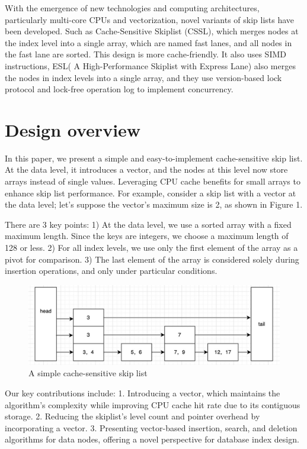 \documentclass{article}
\begin{document}
With the emergence of new technologies and computing architectures, particularly multi-core CPUs and vectorization, novel variants of skip lists have been developed. Such as Cache-Sensitive Skiplist (CSSL)\cite{ref5}, which merges nodes at the index level into a single array, which are named fast lanes, and all nodes in the fast lane are sorted. This design is more cache-friendly. It also uses SIMD instructions, ESL( A High-Performance Skiplist with Express Lane\cite{ref6})  also merges the nodes in index levels into a single array, and they use version-based lock protocol and lock-free operation log to implement concurrency. 


\section{Design overview}

In this paper, we present a simple and easy-to-implement cache-sensitive skip list. At the data level, it introduces a vector, and the nodes at this level now store arrays instead of single values. Leveraging CPU cache benefits for small arrays to enhance skip list performance. For example, consider a skip list with a vector at the data level; let's suppose the vector's maximum size is 2, as shown in Figure 1. 

There are 3 key points: 1) At the data level, we use a sorted array with a fixed maximum length. Since the keys are integers, we choose a maximum length of 128 or less. 2) For all index levels, we use only the first element of the array as a pivot for comparison. 3) The last element of the array is considered solely during insertion operations, and only under particular conditions.

\begin{figure}[h]
\centering
\includegraphics[width=0.5\linewidth]{skiplist.png}
\caption{A simple cache-sensitive skip list}
\label{fig:fig1}
\end{figure}
Our key contributions include: 1. Introducing a vector, which maintains the algorithm's complexity while improving CPU cache hit rate due to its contiguous storage. 2. Reducing the skiplist's level count and pointer overhead by incorporating a vector. 3. Presenting vector-based insertion, search, and deletion algorithms for data nodes, offering a novel perspective for database index design.
\end{document}
